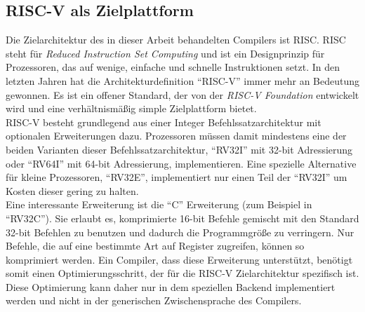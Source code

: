 \subsection{RISC-V als Zielplattform}

Die Zielarchitektur des in dieser Arbeit behandelten Compilers ist RISC.
RISC steht für \textit{Reduced Instruction Set Computing} und ist ein Designprinzip für Prozessoren, das auf wenige, einfache und schnelle Instruktionen setzt.
In den letzten Jahren hat die Architekturdefinition ``RISC-V'' immer mehr an Bedeutung gewonnen.
Es ist ein offener Standard, der von der \textit{RISC-V Foundation} entwickelt wird und eine verhältnismäßig simple Zielplattform bietet\cite{RISCV}.\\

RISC-V besteht grundlegend aus einer Integer Befehlssatzarchitektur mit optionalen Erweiterungen dazu.
Prozessoren müssen damit mindestens eine der beiden Varianten dieser Befehlssatzarchitektur, ``RV32I'' mit 32-bit Adressierung oder ``RV64I'' mit 64-bit Adressierung, implementieren.
Eine spezielle Alternative für kleine Prozessoren, ``RV32E'', implementiert nur einen Teil der ``RV32I'' um Kosten dieser gering zu halten\cite{waterman:2017}.\\
Eine interessante Erweiterung ist die ``C'' Erweiterung (zum Beispiel in ``RV32C'').
Sie erlaubt es, komprimierte 16-bit Befehle gemischt mit den Standard 32-bit Befehlen zu benutzen und dadurch die Programmgröße zu verringern.
Nur Befehle, die auf eine bestimmte Art auf Register zugreifen, können so komprimiert werden.
Ein Compiler, dass diese Erweiterung unterstützt, benötigt somit einen Optimierungsschritt, der für die RISC-V Zielarchitektur spezifisch ist.
Diese Optimierung kann daher nur in dem speziellen Backend implementiert werden und nicht in der generischen Zwischensprache des Compilers.
